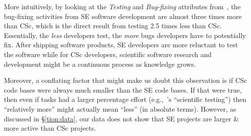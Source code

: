 \documentclass[conference,10pt]{IEEEtran}
\begin{document}
More intuitively, by looking at the \textit{Testing} and \textit{Bug-fixing} attributes from~, the bug-fixing activities from SE software development are almost three times more than CSc, which is the direct result from testing 2.5 times less than CSc. Essentially, the \textit{less} developers test, the \textit{more} bugs developers have to potentially fix. After shipping software products, SE developers are more reluctant to test the software while for CSc developers, scientific software research and development might be a continuous process as knowledge grows.

Moreover, a conflating factor that might make us doubt this observation is if CSc code bases were always much smaller than the SE code bases. If that were true, then even if tasks had a larger percentage effort 
(e.g.,~'s ``scientific testing'') then  ``relatively more'' might actually
mean ``less'' (in absolute terms). 
However, as discussed in \S\ref{tion:data}, our data does not show that SE projects are larger \& more active
than CSc projects.










 
\end{document}
